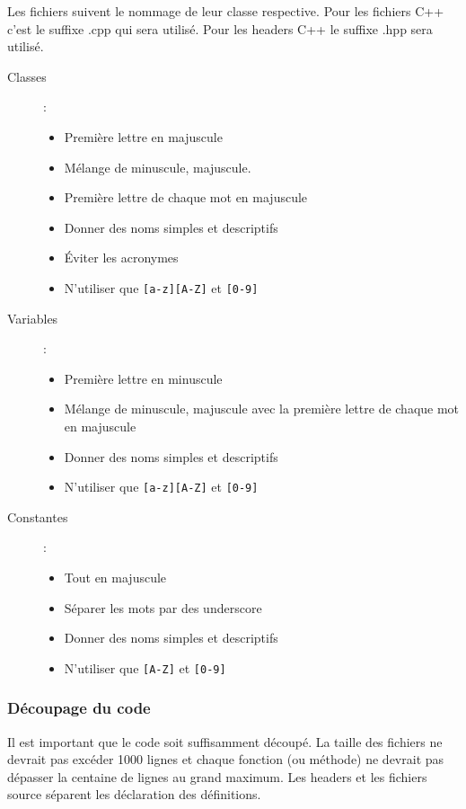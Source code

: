 \documentclass[10pt,a4paper]{article}
\begin{document}
Les fichiers suivent le nommage de leur classe respective.
Pour les fichiers C++ c'est le suffixe .cpp qui sera utilisé. Pour les headers C++ le suffixe .hpp sera utilisé.
\begin{description}
\item [Classes] :
\begin{itemize}
\item Première lettre en majuscule 
\item Mélange de minuscule, majuscule. 
\item Première lettre de chaque mot en majuscule
\item Donner des noms simples et descriptifs 
\item Éviter les acronymes 
\item N’utiliser que \verb|[a-z][A-Z]| et \verb|[0-9]|
\end{itemize}

\item [Variables] : 
\begin{itemize}
\item Première lettre en minuscule
\item Mélange de minuscule, majuscule avec la première lettre de chaque mot en majuscule 
\item Donner des noms simples et descriptifs 
\item N’utiliser que \verb|[a-z][A-Z]| et \verb|[0-9]|
\end{itemize}


\item [Constantes] :
\begin{itemize}
\item Tout en majuscule 
\item Séparer les mots par des underscore
\item Donner des noms simples et descriptifs 
\item N’utiliser que \verb|[A-Z]| et \verb|[0-9] |
\end{itemize}

\end{description}

\subsubsection{Découpage du code}

Il est important que le code soit suffisamment découpé. La taille des fichiers ne devrait pas excéder 1000 lignes et chaque fonction (ou méthode) ne devrait pas dépasser la centaine de lignes au grand maximum. Les headers et les fichiers source séparent les déclaration des définitions.
\end{document}

